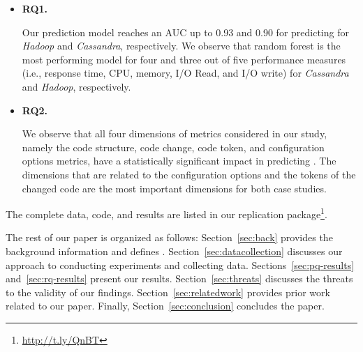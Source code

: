 \begin{itemize}
    
    \item \textbf{RQ1. \RQII}
    
    Our prediction model reaches an AUC up to 0.93 and 0.90 for predicting \inconsistent for \emph{Hadoop} and \emph{Cassandra}, respectively. We observe that random forest is the most performing model for four and three out of five performance measures (i.e., response time, CPU, memory, I/O Read, and I/O write) for \emph{Cassandra} and \emph{Hadoop}, respectively. 
    
    \item\textbf{RQ2. \RQIII}
    
    We observe that all four dimensions of metrics considered in our study, namely the code structure, code change, code token, and configuration options metrics, have a statistically significant impact in predicting \inconsistent. The dimensions that are related to the configuration options and the tokens of the changed code are the most important dimensions for both case studies. 
    
\end{itemize}

The complete data, code, and results are listed in our replication package\footnote{\url{http://t.ly/QnBT}}.

 The rest of our paper is organized as follows: Section~\ref{sec:back} provides the background information and defines \inconsistent. Section~\ref{sec:datacollection} discusses our approach to conducting experiments and collecting data. Sections~\ref{sec:pq-results} and~\ref{sec:rq-results} present our results. Section~\ref{sec:threats} discusses the threats to the validity of our findings. Section~\ref{sec:relatedwork} provides prior work related to our paper. Finally, Section~\ref{sec:conclusion} concludes the paper.



